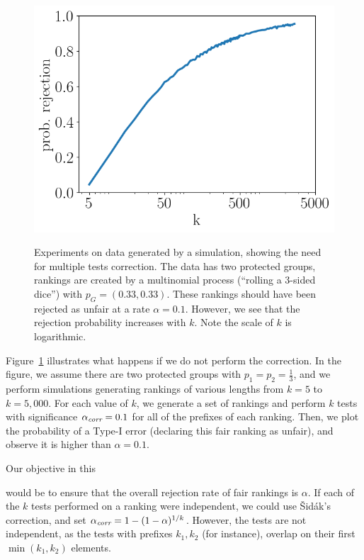 \begin{figure}[t!]
	\centering
	{\includegraphics[width=.48\textwidth]{pics/failProbPlotMultinom.png}}
	\CaptionMargin
	\caption{Experiments on data generated by a simulation, showing the need for multiple tests correction.
		The data has two protected groups, rankings are created by a multinomial process (``rolling a 3-sided dice'') with $p_G = (0.33, 0.33)$.
		These rankings should have been rejected as unfair at a rate $\alpha = 0.1$.
		However, we see that the rejection probability increases with $k$.
		Note the scale of $k$ is logarithmic.}
	\label{fig:why-adjustment-is-needed-multinomial}
\end{figure}

Figure~\ref{fig:why-adjustment-is-needed-multinomial} illustrates what happens if we do not perform the correction.
%
In the figure, we assume there are two protected groups with $p_1=p_2=\frac{1}{3}$, and we perform simulations generating rankings of various lengths from $k=5$ to $k=5,000$.
%
For each value of $k$, we generate a set of rankings and perform $k$ tests with significance $\alpha_\textit{corr}=0.1$ for all of the prefixes of each ranking.
%
Then, we plot the probability of a Type-I error (declaring this fair ranking as unfair), and observe it is higher than $\alpha = 0.1$.
%

Our objective in this


 would be to ensure that the overall rejection rate of fair rankings is $\alpha$.
%
If each of the $k$ tests performed on a ranking were independent, we could use {\v S}id{\'a}k's correction, and set $\alpha_\textit{corr} = 1 - (1 - \alpha)^{1/k}$.
%
However, the tests are not independent, as the tests with prefixes $k_1, k_2$ (for instance), overlap on their first $\min(k_1, k_2)$ elements.
%


